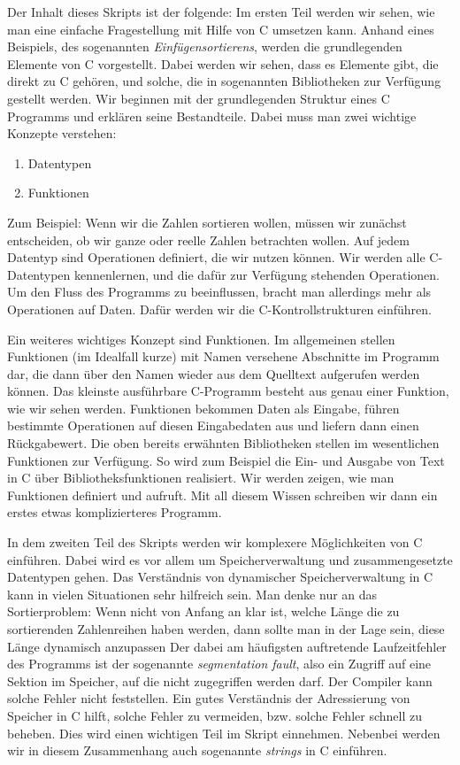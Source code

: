 Der Inhalt dieses Skripts ist der folgende: Im ersten Teil werden wir sehen, wie man eine einfache Fragestellung mit Hilfe von C umsetzen kann.
Anhand eines Beispiels, des sogenannten \emph{Einfügensortierens}, werden die grundlegenden Elemente von C vorgestellt.
Dabei werden wir sehen, dass es Elemente gibt, die direkt zu C gehören, und solche, die in sogenannten Bibliotheken zur Verfügung gestellt werden.
Wir beginnen mit der grundlegenden Struktur eines C Programms und erklären seine Bestandteile.
Dabei muss man zwei wichtige Konzepte verstehen:
\begin{enumerate}
\item Datentypen
\item Funktionen
\end{enumerate}
Zum Beispiel: Wenn wir die Zahlen sortieren wollen, müssen wir zunächst entscheiden, ob wir ganze oder reelle Zahlen betrachten wollen.
Auf jedem Datentyp sind Operationen definiert, die wir nutzen können.
Wir werden alle C-Datentypen kennenlernen, und die dafür zur Verfügung stehenden Operationen.
Um den Fluss des Programms zu beeinflussen, bracht man allerdings mehr als Operationen auf Daten. 
Dafür werden wir die C-Kontrollstrukturen einführen.

Ein weiteres wichtiges Konzept sind Funktionen.
Im allgemeinen stellen Funktionen (im Idealfall kurze) mit Namen versehene Abschnitte im Programm dar, die dann über den Namen wieder aus dem Quelltext aufgerufen werden können.
Das kleinste ausführbare C-Programm besteht aus genau einer Funktion, wie wir sehen werden.
Funktionen bekommen Daten als Eingabe, führen bestimmte Operationen auf diesen Eingabedaten aus und liefern dann einen Rückgabewert.
Die oben bereits erwähnten Bibliotheken stellen im wesentlichen Funktionen zur Verfügung.
So wird zum Beispiel die Ein- und Ausgabe von Text in C über Bibliotheksfunktionen realisiert.
Wir werden zeigen, wie man Funktionen definiert und aufruft.
Mit all diesem Wissen schreiben wir dann ein erstes etwas komplizierteres Programm.

In dem zweiten Teil des Skripts werden wir komplexere Möglichkeiten von C einführen.
Dabei wird es vor allem um Speicherverwaltung und zusammengesetzte Datentypen gehen.
Das Verständnis von dynamischer Speicherverwaltung in C kann in vielen Situationen sehr hilfreich sein.
Man denke nur an das Sortierproblem: Wenn nicht von Anfang an klar ist, welche Länge die zu sortierenden Zahlenreihen haben werden, dann sollte man in der Lage sein, diese Länge dynamisch anzupassen
Der dabei am häufigsten auftretende Laufzeitfehler des Programms ist der sogenannte \emph{segmentation fault}, also ein Zugriff auf eine Sektion im Speicher, auf die nicht zugegriffen werden darf.
Der Compiler kann solche Fehler nicht feststellen.
Ein gutes Verständnis der Adressierung von Speicher in C hilft, solche Fehler zu vermeiden, bzw. solche Fehler schnell zu beheben.
Dies wird einen wichtigen Teil im Skript einnehmen.
Nebenbei werden wir in diesem Zusammenhang auch sogenannte \emph{strings} in C einführen.

